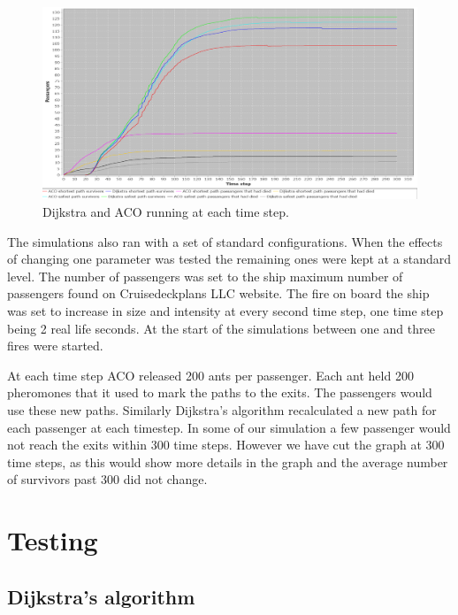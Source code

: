 \begin{figure} [h]
\centering
\hspace*{-1.0in}
\includegraphics[scale=0.35]{images/Graph-using-200-rounds-140-passangers-and-one-fire.png}
\caption{Dijkstra and ACO running at each time step.}
\label{fig:celeb}
\end{figure}
The simulations also ran with a set of standard configurations. When the effects of changing one parameter was tested the remaining ones were kept at a standard level. The number of passengers was set to the ship maximum number of passengers found on Cruisedeckplans LLC website\cite{cruseships}. The fire on board the ship was set to increase in size and intensity at every second time step, one time step being 2 real life seconds. At the start of the simulations between one and three fires were started.

At each time step ACO released 200 ants per passenger. Each ant held 200 pheromones that it used to mark the paths to the exits. The passengers would use these new paths. Similarly Dijkstra's algorithm recalculated a new path for each passenger at each timestep. In some of our simulation a few passenger would not reach the exits within 300 time steps. However we have cut the graph at 300 time steps, as this would show more details in the graph and the average number of survivors past 300 did not change. 

\section{Testing}

\subsection{Dijkstra's algorithm}

